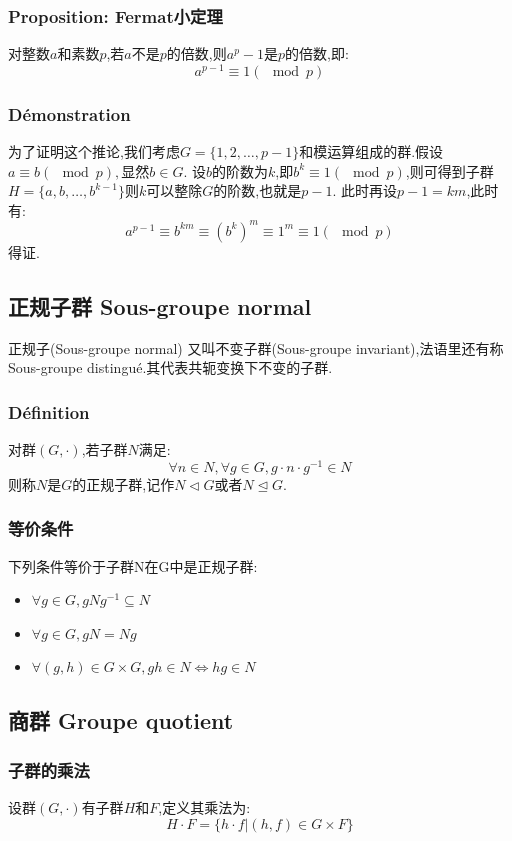 \documentclass[12pt, a4paper, oneside]{ctexbook}
\begin{document}
  \subsubsection{Proposition: Fermat小定理}
  对整数$a$和素数$p$,若$a$不是$p$的倍数,则$a^p-1$是$p$的倍数,即:
  $$
    a^{p-1}\equiv 1(\mod p)
  $$
  \subsubsection{Démonstration}
  为了证明这个推论,我们考虑$G=\{1,2,\dots , p-1\}$和模运算组成的群.假设$a\equiv b(\mod p),\text{显然}b\in G$.
  设$b$的阶数为$k$,即$b^k\equiv 1(\mod p)$,则可得到子群$H=\{a,b,\dots ,b^{k-1}\}$则$k$可以整除$G$的阶数,也就是$p-1$.
  此时再设$p-1=km$,此时有:
  $$
    a^{p-1}\equiv b^{km}\equiv (b^k)^m\equiv 1^m\equiv 1(\mod p)
  $$得证.
  \subsection{正规子群 Sous-groupe normal}
  正规子(Sous-groupe normal) 又叫不变子群(Sous-groupe invariant),法语里还有称Sous-groupe distingué.其代表共轭变换下不变的子群.
  \subsubsection{Définition}
  对群$(G,\cdot)$,若子群$N$满足:
  $$
  \forall n\in N,\forall g\in G,g\cdot n\cdot g^{-1}\in N
  $$则称$N$是$G$的正规子群,记作$N\lhd G$或者$N\unlhd G$.
  \subsubsection{等价条件}
  下列条件等价于子群N在G中是正规子群:
  \begin{itemize}
    \item $\forall g\in G,gNg^{-1}\subseteq N $
    \item $\forall g\in G,gN=Ng $
    \item $\forall (g,h)\in G\times G,gh\in N\Leftrightarrow hg\in N$
  \end{itemize}


  \subsection{商群 Groupe quotient}
  \subsubsection{子群的乘法}
  设群$(G,\cdot)\text{有子群}H\text{和}F$,定义其乘法为:
  $$
  H\cdot F=\{h\cdot f|(h,f)\in G\times F \}
  $$
\end{document}
